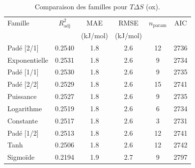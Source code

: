 \begin{table}[htbp]
\centering
\footnotesize
\caption{Comparaison des familles pour $T\Delta S$ (ox).}
\label{tab:s4_tds_ox_families}
\begin{tabular}{lccccc}
\toprule
Famille & $R^2_{\mathrm{adj}}$ & MAE & RMSE & $n_{\mathrm{param}}$ & AIC \\
 & & (kJ/mol) & (kJ/mol) & & \\
\midrule
Padé [2/1] & 0.2540 & 1.8 & 2.6 & 12 & 2736 \\
Exponentielle & 0.2531 & 1.8 & 2.6 & 9 & 2734 \\
Padé [1/1] & 0.2530 & 1.8 & 2.6 & 9 & 2735 \\
Padé [2/2] & 0.2529 & 1.8 & 2.6 & 15 & 2741 \\
Puissance & 0.2527 & 1.8 & 2.6 & 9 & 2735 \\
Logarithme & 0.2519 & 1.8 & 2.6 & 6 & 2734 \\
Constante & 0.2517 & 1.8 & 2.6 & 3 & 2731 \\
Padé [1/2] & 0.2513 & 1.8 & 2.6 & 12 & 2741 \\
Tanh & 0.2506 & 1.8 & 2.6 & 12 & 2742 \\
Sigmoïde & 0.2194 & 1.9 & 2.7 & 9 & 2797 \\
\bottomrule
\end{tabular}
\end{table}